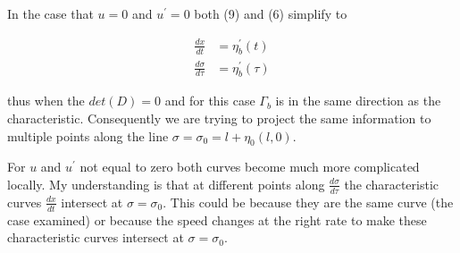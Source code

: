 \documentclass{article}
\begin{document}
In the case that $u = 0$ and $u^\prime = 0$ both (9) and (6) simplify to

\begin{align}
\frac{dx}{dt} &= \eta_b^\prime(t)\\
\frac{d\sigma}{d\tau} &= \eta_b^\prime(\tau)
\end{align}

thus when the $det(D) = 0$ and for this case $\Gamma_b$ is in the same direction as the characteristic. Consequently we are trying to project the same information to multiple points along the line $\sigma = \sigma_0 = l +\eta_0(l,0)$.

	For $u$ and $u^\prime$ not equal to zero both curves become much more complicated locally. My understanding is that at different points along $\frac{d\sigma}{d\tau}$ the characteristic curves $\frac{dx}{dt}$ intersect at $\sigma = \sigma_0$. This could be because they are the same curve (the case examined) or because the speed changes at the right rate to make these characteristic curves intersect at $\sigma = \sigma_0$.
	
	
	
\end{document}
